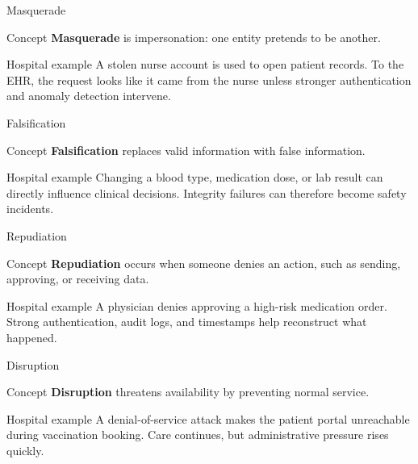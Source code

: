 \documentclass[presentation]{beamer}
\begin{document}
\begin{frame}[c]{Masquerade}
\begin{block}{Concept}
\textbf{Masquerade} is impersonation: one entity pretends to be another.
\end{block}

\begin{exampleblock}{Hospital example}
A stolen nurse account is used to open patient records. To the EHR, the request looks like it
came from the nurse unless stronger authentication and anomaly detection intervene.
\end{exampleblock}
\end{frame}

\begin{frame}[c]{Falsification}
\begin{block}{Concept}
\textbf{Falsification} replaces valid information with false information.
\end{block}

\begin{exampleblock}{Hospital example}
Changing a blood type, medication dose, or lab result can directly influence clinical decisions.
Integrity failures can therefore become safety incidents.
\end{exampleblock}
\end{frame}

\begin{frame}[c]{Repudiation}
\begin{block}{Concept}
\textbf{Repudiation} occurs when someone denies an action, such as sending, approving, or receiving
data.
\end{block}

\begin{exampleblock}{Hospital example}
A physician denies approving a high-risk medication order. Strong authentication, audit logs, and
timestamps help reconstruct what happened.
\end{exampleblock}
\end{frame}

\begin{frame}[c]{Disruption}
\begin{block}{Concept}
\textbf{Disruption} threatens availability by preventing normal service.
\end{block}

\begin{exampleblock}{Hospital example}
A denial-of-service attack makes the patient portal unreachable during vaccination booking. Care
continues, but administrative pressure rises quickly.
\end{exampleblock}
\end{frame}
\end{document}
